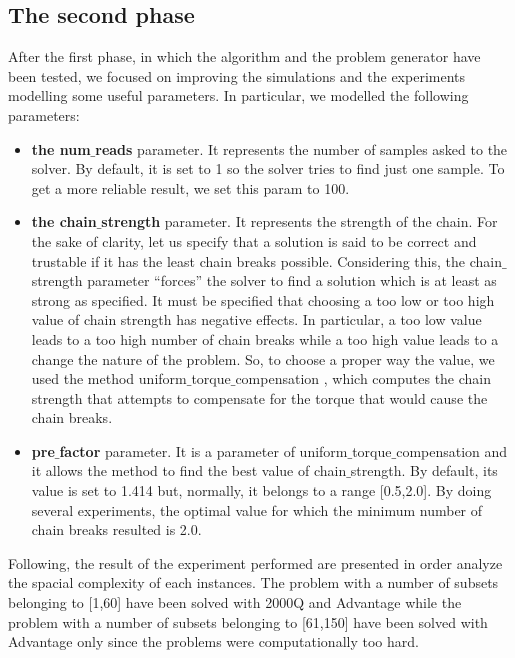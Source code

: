 \documentclass[oneside,a4paper]{article}
\begin{document}
\subsection{The second phase}
After the first phase, in which the algorithm and the problem generator have been tested, we focused on improving the simulations and the experiments modelling some useful parameters. In particular, we modelled the following parameters:\\
\begin{itemize}
    \item \textbf{the num$\_$reads} parameter. It represents the number of samples asked to the solver. By default, it is set to 1 so the solver tries to find just one sample. To get a more reliable result, we set this param to 100.
    \item \textbf{the chain$\_$strength} parameter. It represents the strength of the chain. For the sake of clarity, let us specify that a solution is said to be correct and trustable if it has the least chain breaks possible. Considering this, the chain$\_$strength parameter “forces” the solver to find a solution which is at least as strong as specified. It must be specified that choosing a too low or too high value of chain strength has negative effects. In particular, a too low value leads to a too high number of chain breaks while a too high value leads to a change the nature of the problem\cite{WebSite4}. So, to choose a proper way the value, we used the method uniform$\_$torque$\_$compensation \cite{WebSite5}, which computes the chain strength that attempts to compensate for the torque that would cause the chain breaks.
    \item \textbf{pre$\_$factor} parameter. It is a parameter of uniform$\_$torque$\_$compensation and it allows the method to find the best value of chain$\_$strength. By default, its value is set to 1.414 but, normally, it belongs to a range [0.5,2.0]. By doing several experiments, the optimal value for which the minimum number of chain breaks resulted is 2.0.\\
\end{itemize}
Following, the result of the experiment performed are presented in order analyze the spacial complexity of each instances. 
The problem with a number of subsets belonging to [1,60] have been solved with 2000Q and Advantage while the problem with a number of subsets belonging to [61,150] have been solved with Advantage only since the problems were computationally too hard.\\
\\
\end{document}
